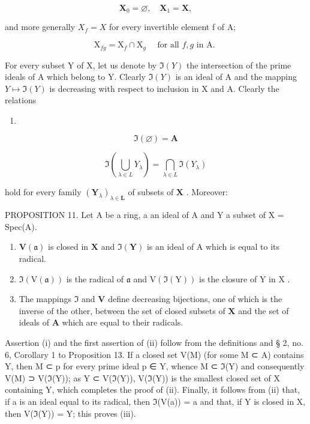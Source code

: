 \[
\mathbf {X} _ {0} = \varnothing , \quad \mathbf {X} _ {1} = \mathbf {X},\tag{5}
\]

and more generally \(X_{f} = X\) for every invertible element f of A;

\[
\mathrm{X} _ {f g} = \mathrm{X} _ {f} \cap \mathrm{X} _ {g} \quad \text {   for   all   } f, g \text {   in   A.   }\tag{6}
\]

For every subset Y of X, let us denote by \(\Im(Y)\) the intersection of the prime ideals of A which belong to Y. Clearly \(\Im(Y)\) is an ideal of A and the mapping \(Y \mapsto \Im(Y)\) is decreasing with respect to inclusion in X and A. Clearly the relations

\begin{enumerate}
\def\labelenumi{(\arabic{enumi})}
\setcounter{enumi}{6}
\tightlist
\item
\end{enumerate}

\[
\Im (\varnothing) = \mathbf {A}\tag{7}
\]

\[
\Im \left(\bigcup_ {\lambda \in L} Y _ {\lambda}\right) = \bigcap_ {\lambda \in L} \Im (Y _ {\lambda})\tag{8}
\]

hold for every family \((\mathbf{Y}_{\lambda})_{\lambda \in \mathbf{L}}\) of subsets of \(\mathbf{X}\) . Moreover:

PROPOSITION 11. Let A be a ring, a an ideal of A and Y a subset of X = Spec(A).

\begin{enumerate}
\def\labelenumi{(\roman{enumi})}
\item
  \(\mathbf{V}(\mathfrak{a})\) is closed in \(\mathbf{X}\) and \(\Im (\mathbf{Y})\) is an ideal of A which is equal to its radical.
\item
  \(\Im(\mathrm{V}(\mathfrak{a}))\) is the radical of \(\mathfrak{a}\) and \(\mathrm{V}(\Im(\mathrm{Y}))\) is the closure of \(\mathrm{Y}\) in \(\mathrm{X}\) .
\item
  The mappings \(\Im\) and \(\mathbf{V}\) define decreasing bijections, one of which is the inverse of the other, between the set of closed subsets of \(\mathbf{X}\) and the set of ideals of \(\mathbf{A}\) which are equal to their radicals.
\end{enumerate}

Assertion (i) and the first assertion of (ii) follow from the definitions and § 2, no. 6, Corollary 1 to Proposition 13. If a closed set V(M) (for some M ⊂ A) contains Y, then M ⊂ p for every prime ideal p ∈ Y, whence M ⊂ \(\mathfrak{I}\)(Y) and consequently V(M) ⊃ V(\(\mathfrak{I}\)(Y)); as Y ⊂ V(\(\mathfrak{I}\)(Y)), V(\(\mathfrak{I}\)(Y)) is the smallest closed set of X containing Y, which completes the proof of (ii). Finally, it follows from (ii) that, if a is an ideal equal to its radical, then \(\mathfrak{I}\)(V(a)) = a and that, if Y is closed in X, then V(\(\mathfrak{I}\)(Y)) = Y; this proves (iii).

